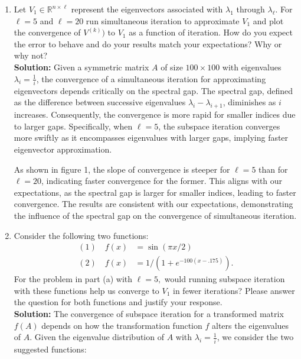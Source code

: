 \documentclass[11pt,onecolumn]{article}
\newcommand{\R}{\mathbb{R}}
\begin{document}
\begin{enumerate}[label=(\alph*)]
    \item Let $V_1\in\R^{n\times \ell}$ represent the eigenvectors associated with $\lambda_1$ through $\lambda_\ell.$ For $\ell = 5$ and $\ell = 20$ run simultaneous iteration to approximate $V_1$ and plot the convergence of $V^{(k)})$ to $V_1$ as a function of iteration. How do you expect the error to behave and do your results match your expectations? Why or why not? \\
          \textbf{Solution:} Given a symmetric matrix \( A \) of size \( 100 \times 100 \) with eigenvalues \( \lambda_i = \frac{1}{i} \), the convergence of a simultaneous iteration for approximating eigenvectors depends critically on the spectral gap. The spectral gap, defined as the difference between successive eigenvalues \( \lambda_{i} - \lambda_{i+1} \), diminishes as \( i \) increases. Consequently, the convergence is more rapid for smaller indices due to larger gaps. Specifically, when \( \ell = 5 \), the subspace iteration converges more swiftly as it encompasses eigenvalues with larger gaps, implying faster eigenvector approximation.

          As shown in figure 1, the slope of convergence is steeper for \( \ell = 5 \) than for \( \ell = 20 \), indicating faster convergence for the former. This aligns with our expectations, as the spectral gap is larger for smaller indices, leading to faster convergence. The results are consistent with our expectations, demonstrating the influence of the spectral gap on the convergence of simultaneous iteration.

    \item Consider the following two functions:
          \begin{equation*}
              \begin{aligned}
                  (1) \quad f(x) & = \sin(\pi x / 2)         \\
                  (2) \quad f(x) & = 1/(1+e^{-100(x-.175)}).
              \end{aligned}
          \end{equation*}
          For the problem in part (a) with $\ell = 5,$ would running subspace iteration with these functions help us converge to $V_1$ in fewer iterations? Please answer the question for both functions and justify your response. \\
          \textbf{Solution:}
          The convergence of subspace iteration for a transformed matrix \( f(A) \) depends on how the transformation function \( f \) alters the eigenvalues of \( A \). Given the eigenvalue distribution of \( A \) with \( \lambda_i = \frac{1}{i} \), we consider the two suggested functions:


\end{enumerate}
\end{document}
